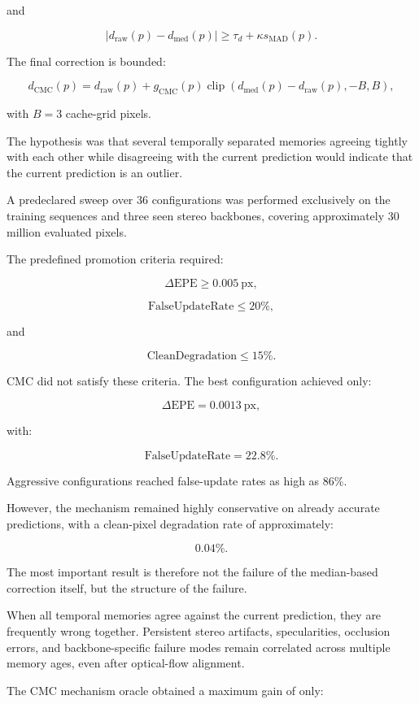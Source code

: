 \documentclass[11pt,a4paper]{article}
\begin{document}
and

\[
\left|
d_{\mathrm{raw}}(p)-d_{\mathrm{med}}(p)
\right|
\geq
\tau_d+\kappa s_{\mathrm{MAD}}(p).
\]

The final correction is bounded:

\[
d_{\mathrm{CMC}}(p)
=
d_{\mathrm{raw}}(p)
+
g_{\mathrm{CMC}}(p)
\operatorname{clip}
\left(
d_{\mathrm{med}}(p)-d_{\mathrm{raw}}(p),
-B,
B
\right),
\]

with \(B=3\) cache-grid pixels.

The hypothesis was that several temporally separated memories agreeing tightly with each other while disagreeing with the current prediction would indicate that the current prediction is an outlier.

A predeclared sweep over 36 configurations was performed exclusively on the training sequences and three seen stereo backbones, covering approximately 30 million evaluated pixels.

The predefined promotion criteria required:

\[
\Delta\mathrm{EPE} \geq 0.005 \ \mathrm{px},
\]

\[
\mathrm{FalseUpdateRate} \leq 20\%,
\]

and

\[
\mathrm{CleanDegradation} \leq 15\%.
\]

CMC did not satisfy these criteria. The best configuration achieved only:

\[
\Delta\mathrm{EPE}=0.0013 \ \mathrm{px},
\]

with:

\[
\mathrm{FalseUpdateRate}=22.8\%.
\]

Aggressive configurations reached false-update rates as high as \(86\%\).

However, the mechanism remained highly conservative on already accurate predictions, with a clean-pixel degradation rate of approximately:

\[
0.04\%.
\]

The most important result is therefore not the failure of the median-based correction itself, but the structure of the failure.

When all temporal memories agree against the current prediction, they are frequently wrong together. Persistent stereo artifacts, specularities, occlusion errors, and backbone-specific failure modes remain correlated across multiple memory ages, even after optical-flow alignment.

The CMC mechanism oracle obtained a maximum gain of only:
\end{document}
